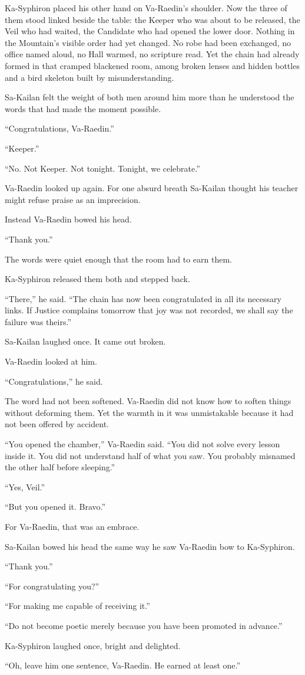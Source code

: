 Ka-Syphiron placed his other hand on Va-Raedin’s shoulder.
Now the three of them stood linked beside the table: the Keeper who was about to be released, the Veil who had waited, the Candidate who had opened the lower door. 
Nothing in the Mountain’s visible order had yet changed. 
No robe had been exchanged, no office named aloud, no Hall warmed, no scripture read. 
Yet the chain had already formed in that cramped blackened room, among broken lenses and hidden bottles and a bird skeleton built by misunderstanding.\par
Sa-Kailan felt the weight of both men around him more than he understood the words that had made the moment possible.\par
“Congratulations, Va-Raedin.”\par
“Keeper.”\par
“No. Not Keeper. Not tonight. Tonight, we celebrate.”\par
Va-Raedin looked up again. For one absurd breath Sa-Kailan thought his teacher might refuse praise as an imprecision.\par
Instead Va-Raedin bowed his head.\par
“Thank you.”\par
The words were quiet enough that the room had to earn them.\par
Ka-Syphiron released them both and stepped back.\par
“There,” he said. “The chain has now been congratulated in all its necessary links. If Justice complains tomorrow that joy was not recorded, we shall say the failure was theirs.”\par
Sa-Kailan laughed once. It came out broken.\par
Va-Raedin looked at him.\par
“Congratulations,” he said.\par
The word had not been softened. Va-Raedin did not know how to soften things without deforming them. Yet the warmth in it was unmistakable because it had not been offered by accident.\par
“You opened the chamber,” Va-Raedin said. “You did not solve every lesson inside it. You did not understand half of what you saw. You probably misnamed the other half before sleeping.”\par
“Yes, Veil.”\par
“But you opened it. Bravo.”\par
For Va-Raedin, that was an embrace.\par
Sa-Kailan bowed his head the same way he saw Va-Raedin bow to Ka-Syphiron.\par
“Thank you.”\par
“For congratulating you?”\par
“For making me capable of receiving it.”\par
“Do not become poetic merely because you have been promoted in advance.”\par
Ka-Syphiron laughed once, bright and delighted.\par
“Oh, leave him one sentence, Va-Raedin. He earned at least one.”\par



